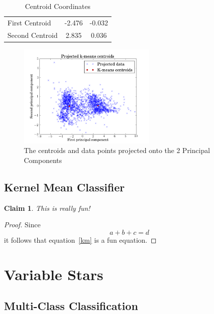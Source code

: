 \documentclass{article}
\theoremstyle{plain}
\newtheorem{claim}[equation]{Claim}
\theoremstyle{nonumberplain}
\newtheorem{proof}{Proof}
\begin{document}
\begin{table}[h!]
\centering
\caption{Centroid Coordinates}
\label{table:centroid}
\begin{tabular}{l|cc}
	\hline \hline
	First Centroid & -2.476 & -0.032 \\
	Second Centroid & 2.835 & 0.036 \\
\end{tabular}
\end{table}

\begin{figure}[htb]
\centering
\includegraphics[height=5cm]{Images/Kmeans_PCA.png}
\caption{The centroids and data points projected onto the 2 Principal Components}
\label{fig:kmeans}
\end{figure}

\subsection{Kernel Mean Classifier}

\begin{claim}
This is really fun!
\end{claim}

\begin{proof}
Since
\begin{equation} \label{eq2}
a + b + c = d
\end{equation}
it follows that equation~\eqref{km} is a fun equation.
\end{proof}

\section{Variable Stars}

\subsection{Multi-Class Classification}
\end{document}
